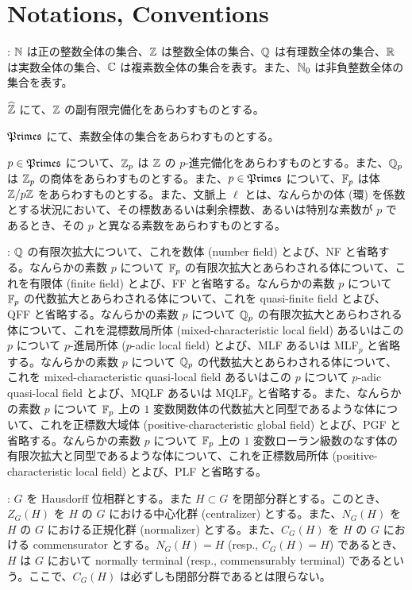 \section{Notations, Conventions}
: $\mathbb{N}$ は正の整数全体の集合、$\mathbb{Z}$ は整数全体の集合、$\mathbb{Q}$ は有理数全体の集合、$\mathbb{R}$ は実数全体の集合、$\mathbb{C}$ は複素数全体の集合を表す。また、$\mathbb{N}_0$ は非負整数全体の集合を表す。

$\widehat{\mathbb{Z}}$ にて、$\mathbb{Z}$ の副有限完備化をあらわすものとする。

$\mathfrak{Primes}$ にて、素数全体の集合をあらわすものとする。

$p \in \mathfrak{Primes}$ について、${\mathbb{Z}}_p$ は $\mathbb{Z}$ の $p$-進完備化をあらわすものとする。また、${\mathbb{Q}}_p$ は ${\mathbb{Z}}_p$ の商体をあらわすものとする。また、$p \in \mathfrak{Primes}$ について、$\mathbb{F}_p$ は体 $\mathbb{Z} / p\mathbb{Z}$ をあらわすものとする。また、文脈上 $\ell$ とは、なんらかの体 (環) を係数とする状況において、その標数あるいは剰余標数、あるいは特別な素数が $p$ であるとき、その $p$ と異なる素数をあらわすものとする。

: $\mathbb{Q}$ の有限次拡大について、これを数体 (number field) とよび、NF と省略する。なんらかの素数 $p$ について $\mathbb{F}_p$ の有限次拡大とあらわされる体について、これを有限体 (finite field) とよび、FF と省略する。なんらかの素数 $p$ について $\mathbb{F}_p$ の代数拡大とあらわされる体について、これを quasi-finite field とよび、QFF と省略する。なんらかの素数 $p$ について ${\mathbb{Q}}_p$ の有限次拡大とあらわされる体について、これを混標数局所体 (mixed-characteristic local field) あるいはこの $p$ について $p$-進局所体 ($p$-adic local field) とよび、MLF あるいは MLF$_p$ と省略する。なんらかの素数 $p$ について ${\mathbb{Q}}_p$ の代数拡大とあらわされる体について、これを mixed-characteristic quasi-local field あるいはこの $p$ について $p$-adic quasi-local field とよび、MQLF あるいは MQLF$_p$ と省略する。また、なんらかの素数 $p$ について $\mathbb{F}_p$ 上の $1$ 変数関数体の代数拡大と同型であるような体について、これを正標数大域体 (positive-characteristic global field) とよび、PGF と省略する。なんらかの素数 $p$ について $\mathbb{F}_p$ 上の $1$ 変数ローラン級数のなす体の有限次拡大と同型であるような体について、これを正標数局所体 (positive-characteristic local field) とよび、PLF と省略する。

: $G$ を Hausdorff 位相群とする。また $H \subset G$ を閉部分群とする。このとき、$Z_G(H)$ を $H$ の $G$ における中心化群 (centralizer) とする。また、$N_G(H)$ を $H$ の $G$ における正規化群 (normalizer) とする。また、$C_G(H)$ を $H$ の $G$ における commensurator とする。$N_G(H) = H$ (resp., $C_G(H) = H$) であるとき、$H$ は $G$ において normally terminal (resp., commensurably terminal) であるという。ここで、$C_G(H)$ は必ずしも閉部分群であるとは限らない。

